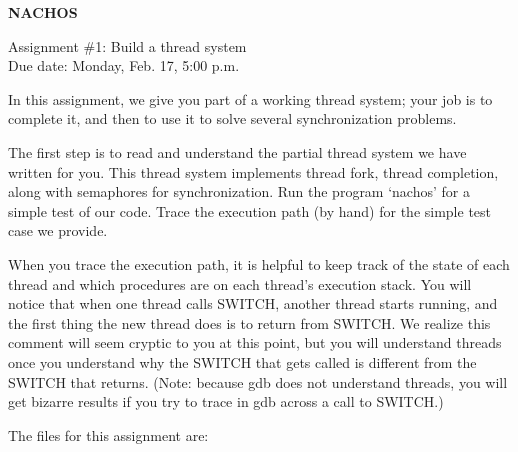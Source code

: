 


\begin{center}
{\large {\bf NACHOS}}



\vspace{.5in}
Assignment \#1: Build a thread system\\
Due date: Monday, Feb. 17, 5:00 p.m.
\end{center}

\vspace{.2in}

In this assignment, we give you part of a working thread system; 
your job is to complete it, and then to use it to solve
several synchronization problems.  

The first step is to read and understand the partial thread system 
we have written for you.  This thread system implements thread fork, 
thread completion, along with semaphores for synchronization.  
Run the program `nachos' for a simple test of our code.
Trace the execution path (by hand) for the simple test case
we provide.

When you trace the execution path, it is helpful to keep track
of the state of each thread and which procedures are on each thread's 
execution stack.
You will notice that when one thread calls SWITCH, another thread
starts running, and the first thing the new thread does is 
to return from SWITCH.
We realize this comment will seem cryptic to you at this point, but you
will understand threads once you understand
why the SWITCH that gets called is different from the SWITCH that returns.
(Note: because gdb does not understand threads, you will get bizarre 
results if you try to trace in gdb across a call to SWITCH.)

The files for this assignment are:

